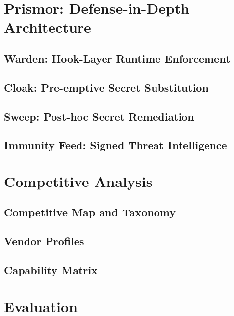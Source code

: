 \documentclass[11pt,letterpaper]{article}
\begin{document}
\section{Prismor: Defense-in-Depth Architecture}

\subsection{Warden: Hook-Layer Runtime Enforcement}

\subsection{Cloak: Pre-emptive Secret Substitution}

\subsection{Sweep: Post-hoc Secret Remediation}

\subsection{Immunity Feed: Signed Threat Intelligence}

\section{Competitive Analysis}

\subsection{Competitive Map and Taxonomy}

\subsection{Vendor Profiles}

\subsection{Capability Matrix}

\section{Evaluation}
\end{document}
